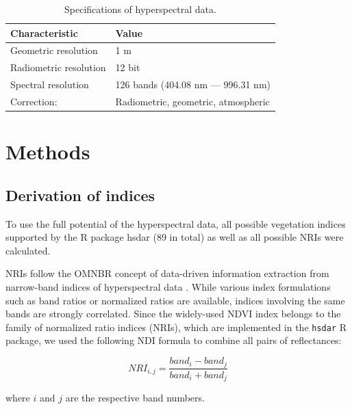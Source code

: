 \documentclass[journal]{IEEEtran}
\begin{document}

\begin{table}[t]
	\centering
	\caption[t]{Specifications of hyperspectral data.}
	\begingroup
	\begin{tabular}{ll}
		\\
		Characteristic         & Value                               \\
		\toprule
		Geometric resolution   & 1 m                                 \\
		Radiometric resolution & 12 bit                              \\
		Spectral resolution    & 126 bands (404.08 nm --- 996.31 nm) \\
		Correction:            & Radiometric, geometric, atmospheric
	\end{tabular}
	\endgroup\label{tab:hyperparameter_metadata}
\end{table}

\section{Methods}

\subsection{Derivation of indices}

To use the full potential of the hyperspectral data, all possible vegetation indices supported by the R package hsdar (89 in total) as well as all possible \ac{NRI}s were calculated.

NRIs follow the \ac{OMNBR} concept of data-driven information extraction from narrow-band indices of hyperspectral data \cite{thenkabail2000,thenkabail2018}.
While various index formulations such as band ratios or normalized ratios are available, indices involving the same bands are strongly correlated.
Since the widely-used NDVI index belongs to the family of normalized ratio indices (NRIs), which are implemented in the \texttt{hsdar} R package, we used the following NDI formula to combine all pairs of reflectances:

\begin{equation}
	NRI_{i,j} = \frac{band_{i} - band_{j}}{band_{i} + band_{j}}
\end{equation}

\noindent
where \(i\) and \(j\) are the respective band numbers.

\bigbreak{}
\end{document}
